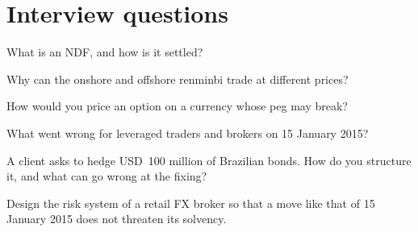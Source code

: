 \section{Interview questions}

\begin{interviewq}\label{iq:m2:emerging-market-fx-and-ndfs:1}
What is an NDF, and how is it settled?
\end{interviewq}

\begin{interviewq}\label{iq:m2:emerging-market-fx-and-ndfs:2}
Why can the onshore and offshore renminbi trade at different prices?
\end{interviewq}

\begin{interviewq}\label{iq:m2:emerging-market-fx-and-ndfs:3}
How would you price an option on a currency whose peg may break?
\end{interviewq}

\begin{interviewq}\label{iq:m2:emerging-market-fx-and-ndfs:4}
What went wrong for leveraged traders and brokers on 15 January 2015?
\end{interviewq}

\begin{interviewq}\label{iq:m2:emerging-market-fx-and-ndfs:5}
A client asks to hedge USD~100 million of Brazilian bonds. How do you structure
it, and what can go wrong at the fixing?
\end{interviewq}

\begin{interviewq}\label{iq:m2:emerging-market-fx-and-ndfs:6}
Design the risk system of a retail FX broker so that a move like that of 15
January 2015 does not threaten its solvency.
\end{interviewq}
